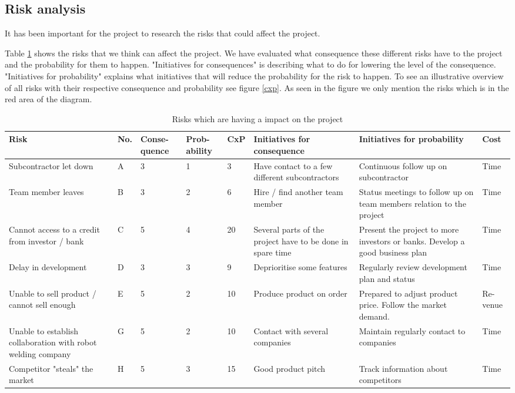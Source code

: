 \subsection{Risk analysis}
\label{risk}
It has been important for the project to research the risks that could affect the project. 

Table \ref{riskshort} shows the risks that we think can affect the project. 
We have evaluated what consequence these different risks have to the project and the probability for them to happen.
"Initiatives for consequences" is describing what to do for lowering the level of the consequence.
"Initiatives for probability" explains what initiatives that will reduce the probability for the risk to happen. 
To see an illustrative overview of all risks with their respective consequence and probability see figure \ref{cxp}. 
As seen in the figure we only mention the risks which is in the red area of the diagram.


\def\arraystretch{1.7}
\begin{table}[h!]
\label{riskshort}
\centering
\scriptsize
\begin{tabular}{|p{3cm} |p{0.3cm} |p{0.9cm} |p{0.9cm} |p{0.5cm} |p{3cm} |p{3cm} |p{0.7cm}|}
\hline
Risk 	&	No.	& Conse- \newline quence	& Prob-\newline  ability	& CxP	& Initiatives \newline for consequence	& Initiatives \newline for probability	& Cost \\
\hline
Subcontractor let down & A & 3 & 1 & 3 & Have contact to a few different subcontractors & Continuous follow up on subcontractor & Time\\
\hline
Team member leaves & B & 3 & 2 & 6 & Hire / find another team member & Status meetings to follow up on team members relation to the project & Time\\
\hline
Cannot access to a credit from investor / bank & C	& 5	&	4 & 20	& Several parts of the project have to be done in spare time & Present the project to more investors or banks. Develop a good business plan & Time\\ 
\hline
Delay in development & D & 3 & 3 & 9 & Deprioritise some features & Regularly review development plan and status & Time\\
\hline
Unable to sell product / cannot sell enough & E & 5 & 2 & 10 & Produce product on order & Prepared to adjust product price. Follow the market demand. & Re-\newline venue\\
\hline
Unable to establish collaboration with robot welding company & G & 5 & 2 & 10 & Contact with several companies & Maintain regularly contact to companies  & Time \\
\hline
Competitor "steals" the market & H & 5 & 3 & 15 & Good product pitch & Track information about competitors & Time\\
\hline
\end{tabular}
\caption{Risks which are having a impact on the project}
\end{table}
\def\arraystretch{1}


